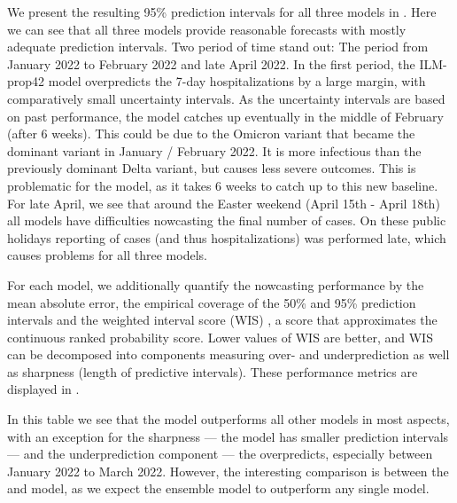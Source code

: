 We present the resulting 95\% prediction intervals for all three models in . Here we can see that all three models provide reasonable forecasts with mostly adequate prediction intervals. Two period of time stand out: The period from January 2022 to February 2022 and late April 2022. In the first period, the ILM-prop42 model overpredicts the 7-day hospitalizations by a large margin, with comparatively small uncertainty intervals. As the uncertainty intervals are based on past performance, the model catches up eventually in the middle of February (after 6 weeks). This could be due to the Omicron variant that became the dominant variant in January / February 2022. It is more infectious than the previously dominant Delta variant, but causes less severe outcomes. This is problematic for the \ilmprop model, as it takes $6$ weeks to catch up to this new baseline. For late April, we see that around the Easter weekend (April 15th - April 18th) all models have difficulties nowcasting the final number of cases. On these public holidays reporting of cases (and thus hospitalizations) was performed late, which causes problems for all three models.

For each model, we additionally quantify the nowcasting performance by the mean absolute error, the empirical coverage of the 50\% and 95\% prediction intervals and the weighted interval score (WIS) \citep{Bracher2021Evaluating}, a score that approximates the continuous ranked probability score. Lower values of WIS are better, and WIS can be decomposed into components measuring over- and underprediction as well as sharpness (length of predictive intervals). These performance metrics are displayed in .

\begin{table}
\centering

\label{tab:df_table_performance}
\caption{%
    Average nowcasting performance metrics of the three models for hospitalization. The weighted interval score (WIS) is additionally decomposed into sharpness and under/over-prediction (see \citep{Bracher2021Evaluating} and \citep[Section 2.5]{Wolffram2023Collaborative} for details). For each metric, the best value has been highlighted by boldface.%
}
\end{table}

In this table we see that the \ensemble model outperforms all other models in most aspects, with an exception for the sharpness --- the \ssm model has smaller prediction intervals --- and the underprediction component --- the \ilmprop overpredicts, especially between January 2022 to March 2022.
However, the interesting comparison is between the \ilmprop and \ssm model, as we expect the ensemble model to outperform any single model. 

